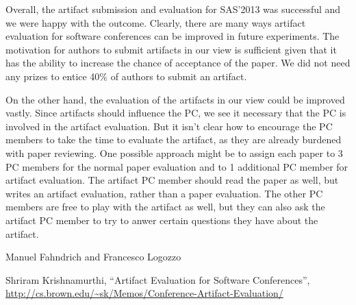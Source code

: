 \documentclass{article}
\begin{document}
Overall, the artifact submission and evaluation for SAS'2013 was
successful and we were happy with the outcome. Clearly, there are many
ways artifact evaluation for software conferences can be improved in
future experiments. The motivation for authors to submit artifacts in
our view is sufficient given that it has the ability to increase the
chance of acceptance of the paper. We did not need any prizes to
entice 40\% of authors to submit an artifact.

On the other hand, the evaluation of the artifacts in our view could
be improved vastly. Since artifacts should influence the PC, we see it
necessary that the PC is involved in the artifact evaluation. But it
isn't clear how to encourage the PC members to take the time to evaluate the
artifact, as they are already burdened with paper reviewing. One
possible approach might be to assign each paper to 3 PC members for
the normal paper evaluation and to 1 additional PC member for artifact
evaluation. The artifact PC member should read the paper as well, but
writes an artifact evaluation, rather than a paper evaluation. The
other PC members are free to play with the artifact as well, but they
can also ask the artifact PC member to try to anwer certain questions
they have about the artifact.


\vspace*{10pt}


\noindent Manuel Fahndrich and Francesco Logozzo


\begin{thebibliography}{}
Shriram Krishnamurthi, ``Artifact Evaluation for Software Conferences'', \url{http://cs.brown.edu/~sk/Memos/Conference-Artifact-Evaluation/}
\end{thebibliography}
\end{document}
